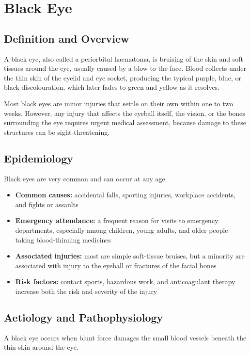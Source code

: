 \chapter{Black Eye}

\section*{Definition and Overview}
A black eye, also called a periorbital haematoma, is bruising of the skin and soft tissues around the eye, usually caused by a blow to the face. Blood collects under the thin skin of the eyelid and eye socket, producing the typical purple, blue, or black discolouration, which later fades to green and yellow as it resolves.

Most black eyes are minor injuries that settle on their own within one to two weeks. However, any injury that affects the eyeball itself, the vision, or the bones surrounding the eye requires urgent medical assessment, because damage to these structures can be sight-threatening.

\section*{Epidemiology}
Black eyes are very common and can occur at any age.

\begin{itemize}
    \item \textbf{Common causes:} accidental falls, sporting injuries, workplace accidents, and fights or assaults
    \item \textbf{Emergency attendance:} a frequent reason for visits to emergency departments, especially among children, young adults, and older people taking blood-thinning medicines
    \item \textbf{Associated injuries:} most are simple soft-tissue bruises, but a minority are associated with injury to the eyeball or fractures of the facial bones
    \item \textbf{Risk factors:} contact sports, hazardous work, and anticoagulant therapy increase both the risk and severity of the injury
\end{itemize}

\section*{Aetiology and Pathophysiology}
A black eye occurs when blunt force damages the small blood vessels beneath the thin skin around the eye.

